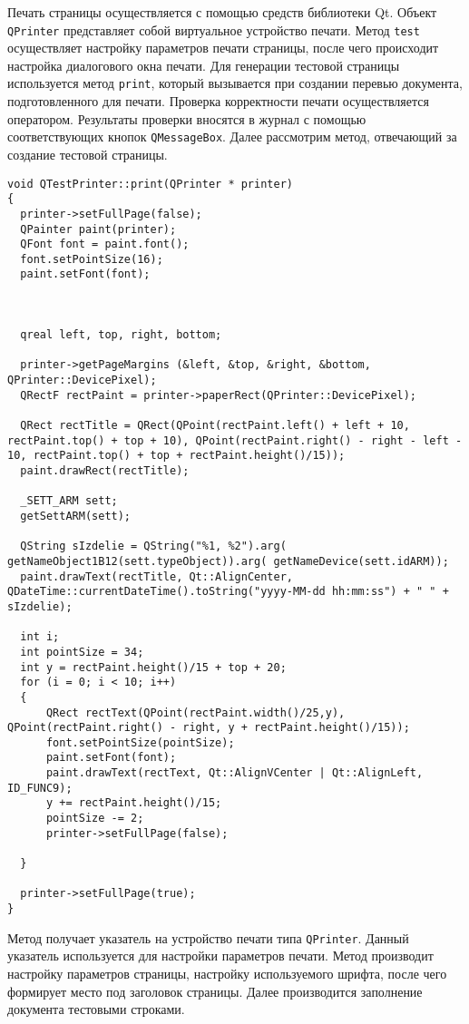 Печать страницы осуществляется с помощью средств библиотеки Qt. Объект \texttt{QPrinter} представляет собой виртуальное
устройство печати. Метод \texttt{test} осуществляет настройку параметров печати страницы, после чего происходит
настройка диалогового окна печати. Для генерации тестовой страницы используется метод \texttt{print}, который вызывается
при создании перевью документа, подготовленного для печати. Проверка корректности печати осуществляется оператором.
Результаты проверки вносятся в журнал с помощью соответствующих кнопок \texttt{QMessageBox}. Далее рассмотрим метод,
отвечающий за создание тестовой страницы.
\medskip
\begin{verbatim}
void QTestPrinter::print(QPrinter * printer)
{
  printer->setFullPage(false);
  QPainter paint(printer);
  QFont font = paint.font();
  font.setPointSize(16);
  paint.setFont(font);



  qreal left, top, right, bottom;

  printer->getPageMargins (&left, &top, &right, &bottom, QPrinter::DevicePixel);
  QRectF rectPaint = printer->paperRect(QPrinter::DevicePixel);

  QRect rectTitle = QRect(QPoint(rectPaint.left() + left + 10, rectPaint.top() + top + 10), QPoint(rectPaint.right() - right - left - 10, rectPaint.top() + top + rectPaint.height()/15));
  paint.drawRect(rectTitle);

  _SETT_ARM sett;
  getSettARM(sett);

  QString sIzdelie = QString("%1, %2").arg( getNameObject1B12(sett.typeObject)).arg( getNameDevice(sett.idARM));
  paint.drawText(rectTitle, Qt::AlignCenter, QDateTime::currentDateTime().toString("yyyy-MM-dd hh:mm:ss") + " " + sIzdelie);

  int i;
  int pointSize = 34;
  int y = rectPaint.height()/15 + top + 20;
  for (i = 0; i < 10; i++)
  {
	  QRect rectText(QPoint(rectPaint.width()/25,y), QPoint(rectPaint.right() - right, y + rectPaint.height()/15));
	  font.setPointSize(pointSize);
	  paint.setFont(font);
	  paint.drawText(rectText, Qt::AlignVCenter | Qt::AlignLeft, ID_FUNC9);
	  y += rectPaint.height()/15;
	  pointSize -= 2;
	  printer->setFullPage(false);

  }

  printer->setFullPage(true);
}

\end{verbatim}
\medskip

Метод получает указатель на устройство печати типа \texttt{QPrinter}. Данный указатель используется для настройки
параметров печати. Метод производит настройку параметров страницы, настройку используемого шрифта, после чего формирует
место под заголовок страницы. Далее производится заполнение документа тестовыми строками.

